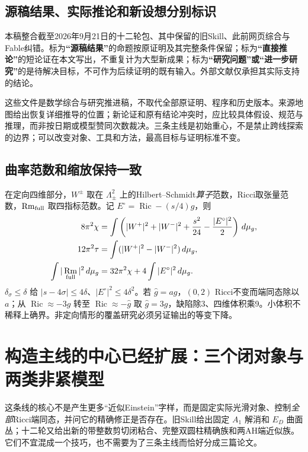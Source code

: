 \documentclass[UTF8,fontset=fandol,zihao=-4]{ctexart}
\theoremstyle{research}
\DeclareMathOperator{\Ric}{Ric}\DeclareMathOperator{\Rm}{Rm}
\begin{document}
\subsection{源稿结果、实际推论和新设想分别标识}
本稿整合截至2026年9月21日的十二轮包\cite{Package}、其中保留的旧Skill\cite{Baseline}、此前网页综合与Fable纠错。标为\textbf{“源稿结果”}的命题按原证明及其完整条件保留；标为\textbf{“直接推论”}的短论证在本文写出，不重复计为大型新成果；标为\textbf{“研究问题”或“进一步研究”}的是待解决目标，不可作为后续证明的既有输入。外部文献仅承担其实际支持的结论。

这些文件是数学综合与研究推进稿，不取代全部原证明、程序和历史版本。来源地图给出恢复详细推导的位置；新论证和原有结论冲突时，应比较具体假设、规范与推理，而非按日期或模型赞同次数裁决。三条主线是初始重心，不是禁止跨线探索的边界；可以改变对象、工具和方法，最高目标与证明标准不变。

\subsection{曲率范数和缩放保持一致}
在定向四维部分，$W^\pm$ 取在 $\Lambda^2_\pm$ 上的Hilbert--Schmidt\emph{算子}范数，Ricci取张量范数，$\Rm_{\rm full}$ 取四指标范数。记 $E^\circ=\Ric-(s/4)g$，则
\begin{align}
 8\pi^2\chi&=\int\left(|W^+|^2+|W^-|^2+\frac{s^2}{24}-\frac{|E^\circ|^2}{2}\right)\dd,\label{eq:cgb}\\
 12\pi^2\tau&=\int(|W^+|^2-|W^-|^2)\dd,\\
 \int|\Rm_{\rm full}|^2\dd&=32\pi^2\chi+4\int|E^\circ|^2\dd.\label{eq:rm}
\end{align}
$\delta_\sigma\le\delta$ 给 $|s-4\sigma|\le4\delta$、$|E^\circ|^2\le4\delta^2$。若 $\widehat g=ag$，$(0,2)$ Ricci不变而端同态除以 $a$；从 $\Ric\approx-3g$ 转至 $\Ric\approx-\widehat g$ 取 $\widehat g=3g$，缺陷除3、四维体积乘9。小体积不稀释上确界。非定向情形的覆盖研究必须另证输出的等变下降。
\section{构造主线的中心已经扩展：三个闭对象与两类非紧模型}
这条线的核心不是产生更多“近似Einstein”字样，而是固定实际光滑对象、控制\emph{全部}Ricci端同态，并问它的精确修正是否存在。旧Skill给出固定 $A_1$ 解消和 $E_D$ 曲面丛；十二轮又给出新的带整数剪切闭粘合、完整双圆柱精确族和两AH端近似族。它们不宜混成一个技巧，也不需要为了三条主线而恰好分成三篇论文。
\end{document}
